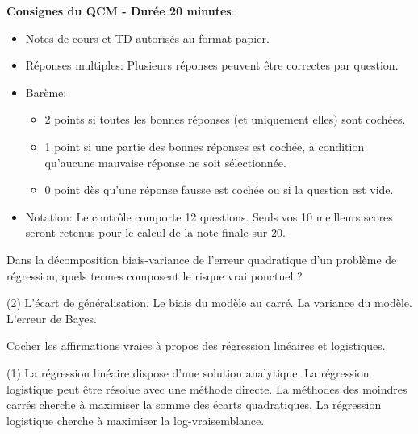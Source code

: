 \documentclass[solutions]{../cc}
\begin{document}
	
	\student
		
	\noindent \textbf{Consignes du QCM - Durée 20 minutes}:
	\begin{itemize}[nosep]
		\item Notes de cours et TD autorisés au format papier.
		\item Réponses multiples: Plusieurs réponses peuvent être correctes par question.
		\item Barème:
		\begin{itemize}[nosep]
			\item 2 points si toutes les bonnes réponses (et uniquement elles) sont cochées.
			\item 1 point si une partie des bonnes réponses est cochée, à condition qu'aucune mauvaise réponse ne soit sélectionnée.
			\item 0 point dès qu'une réponse fausse est cochée ou si la question est vide.
		\end{itemize}
		\item Notation: Le contrôle comporte 12 questions. Seuls vos 10 meilleurs scores seront retenus pour le calcul de la note finale sur 20.
	\end{itemize}
	
		\begin{question}
			Dans la décomposition biais-variance de l'erreur quadratique d'un problème de régression, quels termes composent le risque vrai ponctuel ?
			\begin{tasks}(2)
				\task L'écart de généralisation.
				\task Le biais du modèle au carré.
				\task La variance du modèle.
				\task L'erreur de Bayes.
			\end{tasks}
		\end{question}

		\begin{question}
			Cocher les affirmations vraies à propos des régression linéaires et logistiques.
			\begin{tasks}(1)
				\task La régression linéaire dispose d'une solution analytique.
				\task La régression logistique peut être résolue avec une méthode directe.
				\task La méthodes des moindres carrés cherche à maximiser la somme des écarts quadratiques.
				\task La régression logistique cherche à maximiser la log-vraisemblance.
			\end{tasks}
		\end{question}
\end{document}
